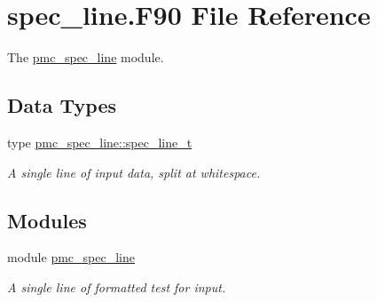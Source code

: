 \hypertarget{spec__line_8_f90}{}\section{spec\+\_\+line.\+F90 File Reference}
\label{spec__line_8_f90}


The \mbox{\hyperlink{namespacepmc__spec__line}{pmc\+\_\+spec\+\_\+line}} module.  


\subsection*{Data Types}
\begin{DoxyCompactItemize}
\item 
type \mbox{\hyperlink{structpmc__spec__line_1_1spec__line__t}{pmc\+\_\+spec\+\_\+line\+::spec\+\_\+line\+\_\+t}}
\begin{DoxyCompactList}\small\item\em A single line of input data, split at whitespace. \end{DoxyCompactList}\end{DoxyCompactItemize}
\subsection*{Modules}
\begin{DoxyCompactItemize}
\item 
module \mbox{\hyperlink{namespacepmc__spec__line}{pmc\+\_\+spec\+\_\+line}}
\begin{DoxyCompactList}\small\item\em A single line of formatted test for input. \end{DoxyCompactList}\end{DoxyCompactItemize}
